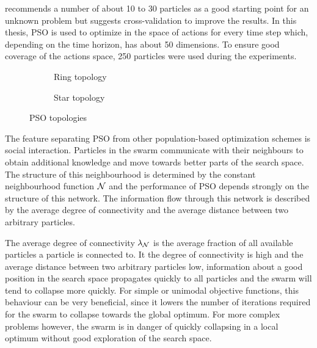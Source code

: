 \citeauthor{engelbrecht_fundamentals_2006} recommends a number of about 10 to 30 particles as a good starting point for an unknown problem but suggests cross-validation to improve the results.
In this thesis, PSO is used to optimize in the space of actions for every time step which, depending on the time horizon, has about 50 dimensions.
To ensure good coverage of the actions space, 250 particles were used during the experiments.

\begin{figure}[t]
    \centering
    \begin{subfigure}{\subfigurewidth}
        \caption{Ring topology}
        \label{fig:pso_topology:ring}
    \end{subfigure}
    \begin{subfigure}{\subfigurewidth}
        \caption{Star topology}
        \label{fig:pso_topology:star}
    \end{subfigure}
    \caption{PSO topologies}
    \label{fig:pso_topology}
\end{figure}
The feature separating PSO from other population-based optimization schemes is social interaction.
Particles in the swarm communicate with their neighbours to obtain additional knowledge and move towards better parts of the search space.
The structure of this neighbourhood is determined by the constant neighbourhood function $\operatorname{\mathcal{N}}$ and the performance of PSO depends strongly on the structure of this network.
The information flow through this network is described by the average degree of connectivity and the average distance between two arbitrary particles.

The average degree of connectivity $\lambda_{\operatorname{\mathcal{N}}}$ is the average fraction of all available particles a particle is connected to.
It the degree of connectivity is high and the average distance between two arbitrary particles low, information about a good position in the search space propagates quickly to all particles and the swarm will tend to collapse more quickly.
For simple or unimodal objective functions, this behaviour can be very beneficial, since it lowers the number of iterations required for the swarm to collapse towards the global optimum.
For more complex problems however, the swarm is in danger of quickly collapsing in a local optimum without good exploration of the search space.

